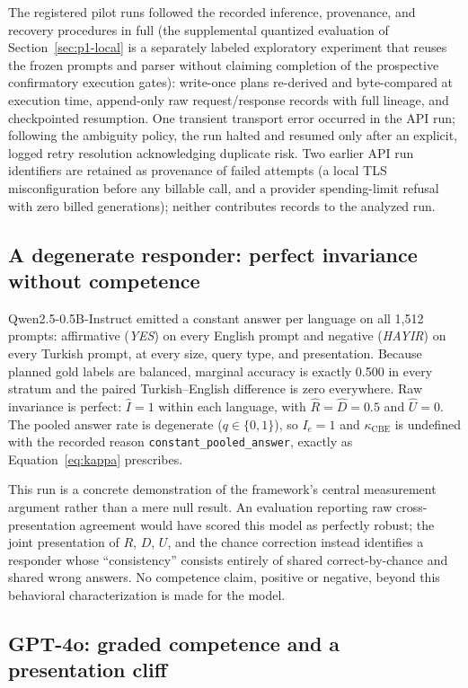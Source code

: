 The registered pilot runs followed the recorded inference, provenance, and recovery procedures in full
(the supplemental quantized evaluation of Section~\ref{sec:p1-local} is a separately labeled exploratory
experiment that reuses the frozen prompts and parser without claiming completion of the prospective
confirmatory execution gates): write-once plans re-derived and byte-compared
at execution time, append-only raw request/response records with full lineage, and checkpointed resumption.
One transient transport error occurred in the API run; following the ambiguity policy, the run halted and
resumed only after an explicit, logged retry resolution acknowledging duplicate risk. Two earlier API run
identifiers are retained as provenance of failed attempts (a local TLS misconfiguration before any billable
call, and a provider spending-limit refusal with zero billed generations); neither contributes records to
the analyzed run.

\subsection{A degenerate responder: perfect invariance without competence}

Qwen2.5-0.5B-Instruct emitted a constant answer per language on all 1,512 prompts: affirmative
(\emph{YES}) on every English prompt and negative (\emph{HAYIR}) on every Turkish prompt, at every size,
query type, and presentation. Because planned gold labels are balanced, marginal accuracy is exactly 0.500
in every stratum and the paired Turkish--English difference is zero everywhere. Raw invariance is perfect:
$\widehat{I} = 1$ within each language, with $\widehat{R} = \widehat{D} = 0.5$ and $\widehat{U} = 0$.
The pooled answer rate is degenerate ($q \in \{0, 1\}$), so $I_e = 1$ and $\kappa_{\mathrm{CBE}}$ is
undefined with the recorded reason \texttt{constant\_pooled\_answer}, exactly as
Equation~\eqref{eq:kappa} prescribes.

This run is a concrete demonstration of the framework's central measurement argument rather than a mere
null result. An evaluation reporting raw cross-presentation agreement would have scored this model as
perfectly robust; the joint presentation of $R$, $D$, $U$, and the chance correction instead identifies a
responder whose ``consistency'' consists entirely of shared correct-by-chance and shared wrong answers.
No competence claim, positive or negative, beyond this behavioral characterization is made for the model.

\subsection{GPT-4o: graded competence and a presentation cliff}

